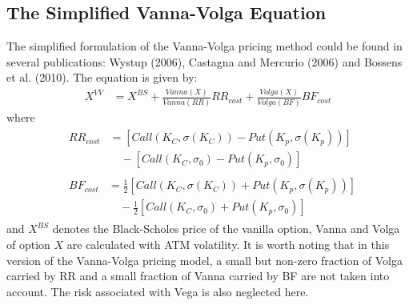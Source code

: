 \subsection{The Simplified Vanna-Volga Equation}
The simplified formulation of the Vanna-Volga pricing method could be found in several publications: Wystup (2006), Castagna and Mercurio (2006) and Bossens et al. (2010).
The equation is given by:
\begin{align}
X^{VV} &= X^{BS} + \frac{Vanna(X)}{Vanna(RR)}RR_{cost}+ \frac{Volga(X)}{Volga(BF)}BF_{cost}
\end{align}
where
\begin{align}
&\begin{aligned}
RR_{cost} &= \left[Call\left( K_C,\sigma\left( K_C\right) \right) -Put\left( K_p,\sigma\left( K_p\right) \right)\right] \\
&\quad - \left[Call\left( K_C,\sigma_0 \right) -Put\left( K_p,\sigma_0 \right)\right]
\end{aligned} \\
&\begin{aligned}
BF_{cost} &= \frac{1}{2} \left[Call\left( K_C,\sigma\left( K_C\right) \right) +Put\left( K_p,\sigma\left( K_p\right) \right)\right] \\
&\quad - \frac{1}{2}\left[Call\left( K_C,\sigma_0 \right) + Put\left( K_p,\sigma_0 \right)\right]
\end{aligned}
\end{align}
and $X^{BS}$ denotes the Black-Scholes price of the vanilla option, Vanna and Volga of option $X$ are calculated with ATM volatility. \newline
It is worth noting that in this version of the Vanna-Volga pricing model, a small but non-zero fraction of Volga carried by RR and a small fraction of Vanna carried by BF are not taken into account. The risk associated with Vega is also neglected here.

